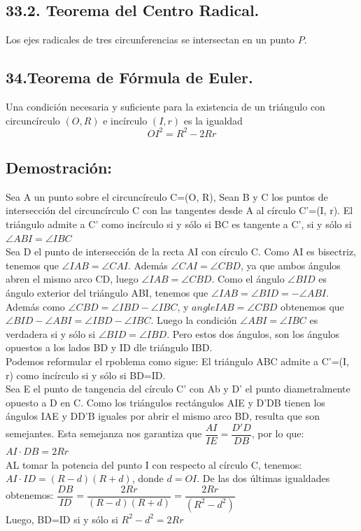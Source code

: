 \documentclass[12pt,a4paper]{article}
\begin{document}
\subsection*{33.2. Teorema del Centro Radical.}
Los ejes radicales de tres circunferencias se intersectan en un punto $P$.
\subsection*{34.Teorema de Fórmula de Euler.}
Una condición necesaria y suficiente para la existencia de un triángulo con circuncírculo $( O, R)$ e incírculo $(I, r)$ es la igualdad $$OI ^2= R^2 - 2Rr$$
\subsection*{Demostración:}
Sea A un punto sobre el circuncírculo C=(O, R), Sean B y C los puntos de intersección del circuncírculo C con las tangentes desde A al círculo C'=(I, r). El triángulo admite a C' como incírculo si y sólo si BC es tangente a C', si y sólo si $\angle ABI= \angle IBC$
\\Sea D el punto de intersección de la recta AI con círculo C. Como AI es bisectriz, tenemos que $\angle IAB= \angle CAI$. Además $\angle CAI= \angle CBD$, ya que ambos ángulos abren el mismo arco CD, luego $\angle IAB= \angle CBD$. Como el ángulo $\angle BID$ es ángulo exterior del triángulo ABI, tenemos que $\angle IAB= \angle BID =- \angle ABI$. Además como $\angle CBD = \angle IBD - \angle IBC$, y $angle IAB= \angle CBD$ obtenemos que $\angle BID - \angle ABI= \angle IBD - \angle IBC$. Luego la condición $\angle ABI = \angle IBC$ es verdadera si y sólo si $\angle BID = \angle IBD$. Pero estos dos ángulos, son los ángulos opuestos a los lados BD y ID dle triángulo IBD.
\\Podemos reformular el rpoblema como sigue: El triángulo ABC admite a C'=(I, r) como incírculo si y sólo si BD=ID.
\\Sea E el punto de tangencia del círculo C' con Ab y D' el punto diametralmente opuesto a D en C. Como los triángulos rectángulos AIE  y D'DB tienen los ángulos IAE y DD'B iguales  por abrir el mismo arco BD, resulta que son semejantes. Esta semejanza nos garantiza que $\dfrac{AI}{IE}= \dfrac{D'D}{DB}$, por lo que: $AI \cdot DB= 2Rr$
\\ AL tomar la potencia del punto I con respecto al círculo C, tenemos: $AI \cdot ID =(R-d)(R+d) $, donde $d=OI$. De las dos últimas igualdades obtenemos:
$\dfrac{DB}{ID}=\dfrac{2Rr}{(R-d)(R+d)}=\dfrac{2Rr}{(R^2-d^2)}$
\\Luego, BD=ID si y sólo si $ R^2- d^2=2Rr$
\end{document}
